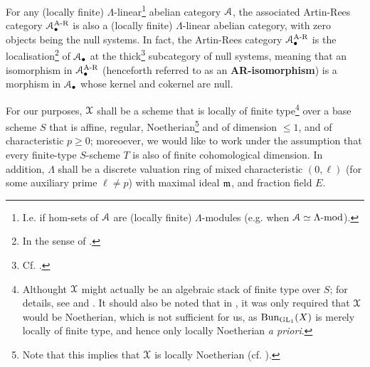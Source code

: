                 \begin{proposition} \label{prop: artin_rees_categories_are_linear_and_abelian}
                    \cite[Expos\'e V, Propositions 2.2.2 et 2.4.1]{sga5} For any (locally finite) $\Lambda$-linear\footnote{I.e. if hom-sets of $\mathcal{A}$ are (locally finite) $\Lambda$-modules (e.g. when $\mathcal{A} \simeq \Lambda\text{-}\mathrm{mod}$).} abelian category $\mathcal{A}$, the associated Artin-Rees category $\mathcal{A}_{\bullet}^{\mathrm{A\text{-}R}}$ is also a (locally finite) $\Lambda$-linear abelian category, with zero objects being the null systems. In fact, the Artin-Rees category $\mathcal{A}_{\bullet}^{\mathrm{A\text{-}R}}$ is the localisation\footnote{In the sense of \cite[\href{https://stacks.math.columbia.edu/tag/02MS}{Tag 02MS}]{stacks}.} of $\mathcal{A}_{\bullet}$ at the thick\footnote{Cf. \cite[\href{https://stacks.math.columbia.edu/tag/02MO}{Tag 02MO}]{stacks}.} subcategory of null systems, meaning that an isomorphism in $\mathcal{A}_{\bullet}^{\mathrm{A\text{-}R}}$ (henceforth referred to as an \textbf{AR-isomorphism}) is a morphism in $\mathcal{A}_{\bullet}$ whose kernel and cokernel are null. 
                \end{proposition}
                
                \begin{convention} \label{conv: l_adic_sheaves_conventions}
                    For our purposes, $\mathcal{X}$ shall be a scheme that is locally of finite type\footnote{Althought $\mathcal{X}$ might actually be an algebraic stack of finite type over $S$; for details, see \cite{laszlo_olsson_adic_sheaves_on_artin_stacks_1} and \cite{laszlo_olsson_adic_sheaves_on_artin_stacks_2}. It should also be noted that in \cite[Subsection 1.4]{conrad_etale_cohomology}, it was only required that $\mathcal{X}$ would be Noetherian, which is not sufficient for us, as $\mathrm{Bun}_{\operatorname{GL}_1}(X)$ is merely locally of finite type, and hence only locally Noetherian \textit{a priori}.} over a base scheme $S$ that is affine, regular, Noetherian\footnote{Note that this implies that $\mathcal{X}$ is locally Noetherian (cf. \cite[\href{https://stacks.math.columbia.edu/tag/01T6}{Tag 01T6}]{stacks}).} and of dimension $\leq 1$, and of characteristic $p \geq 0$; moreoever, we would like to work under the assumption that every finite-type $S$-scheme $T$ is also of finite cohomological dimension. In addition, $\Lambda$ shall be a discrete valuation ring of mixed characteristic $(0, \ell)$ (for some auxiliary prime $\ell \not = p$) with maximal ideal $\mathfrak{m}$, and fraction field $E$.
                \end{convention}
                
